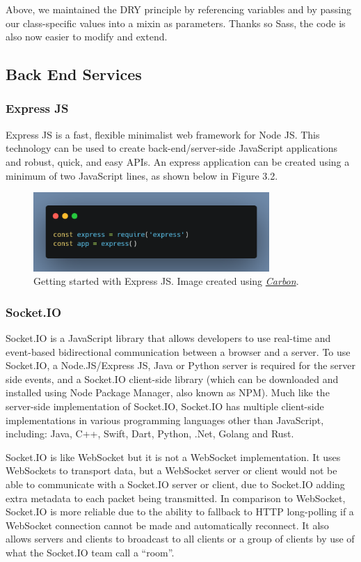 Above, we maintained the DRY principle by referencing variables and by passing our class-specific values into a mixin as parameters. Thanks so Sass, the code is also now easier to modify and extend. 

\subsection{Back End Services}
\label{backendservices}
\subsubsection{Express JS}
Express JS is a fast, flexible minimalist web framework for Node JS. This technology can be used to create back-end/server-side JavaScript applications and robust, quick, and easy APIs. An express application can be created using a minimum of two JavaScript lines, as shown below in Figure 3.2.

\begin{figure}[H]
    \centering
    \includegraphics[width=0.8\textwidth]{img/TechReview/expressJs.png}
    \caption{Getting started with Express JS. Image created using \href{https://carbon.now.sh/}{\textit{Carbon}}.}
\end{figure}

\subsubsection{Socket.IO}
Socket.IO is a JavaScript library that allows developers to use real-time and event-based bidirectional communication between a browser and a server. To use Socket.IO, a Node.JS/Express JS, Java or Python server is required for the server side events, and a Socket.IO client-side library (which can be downloaded and installed using Node Package Manager, also known as NPM). Much like the server-side implementation of Socket.IO, Socket.IO has multiple client-side implementations in various programming languages other than JavaScript, including: Java, C++, Swift, Dart, Python, .Net, Golang and Rust.

Socket.IO is like WebSocket but it is not a WebSocket implementation. It uses WebSockets to transport data, but a WebSocket server or client would not be able to communicate with a Socket.IO server or client, due to Socket.IO adding extra metadata to each packet being transmitted. In comparison to WebSocket, Socket.IO is more reliable due to the ability to fallback to HTTP long-polling if a WebSocket connection cannot be made and automatically reconnect. It also allows servers and clients to broadcast to all clients or a group of clients by use of what the Socket.IO team call a “room”.

